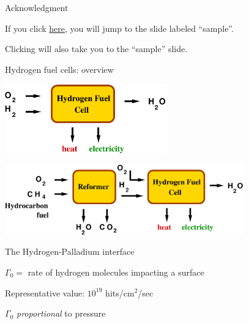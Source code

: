 \documentclass[12pt,a4paper,CJK]{beamer}
\begin{document}
\begin{CJK*}{UTF8}{gkai}
\begin{frame}{Acknowledgment}
\bigskip

If you click \hyperlink{sample}{here}, you will jump to the slide
labeled ``sample''.

Clicking \hyperlink{sample}{} will also
take you to the ``sample'' slide.

\bigskip
{} 

\end{frame}

\begin{frame}{Hydrogen fuel cells: overview}
	\begin{center}
  		\includegraphics[height=3.0cm]{figs/schematic1.pdf}
	\end{center}
	\bigskip

	\pause

	\begin{center}
		\includegraphics[height=3.0cm]{figs/schematic2.pdf}
	\end{center}
	
\end{frame}

\begin{frame}{The Hydrogen-Palladium interface}

$\Gamma_0 = $ rate of hydrogen molecules impacting a surface

Representative value: $10^{19}$ hits/cm$^2$/sec

$\Gamma_0$ \emph{proportional} to pressure

\bigskip


\end{frame}
\end{CJK*}
\end{document}
